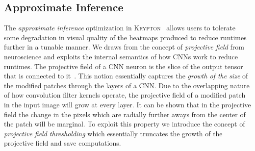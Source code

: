 \documentclass{vldb}
\newcommand{\system}{\textsc{Krypton}}
\begin{document}
\subsection{Approximate Inference}
The \textit{approximate inference} optimization in \system~ allows users to tolerate some degradation in visual quality of the heatmaps produced to reduce runtimes further in a tunable manner.
We draws from the concept of \textit{projective field} from neuroscience and exploits the internal semantics of how CNNs work to reduce runtimes.
The projective field of a CNN neuron is the slice of the output tensor that is connected to it~\cite{basiccnnoperations}.
This notion essentially captures the \textit{growth of the size} of the modified patches through the layers of a CNN.
Due to the overlapping nature of how convolution filter kernels operate, the projective field of a modified patch in the input image will grow at every layer.
It can be shown that in the projective field the change in the pixels which are radially further aways from the center of the patch will be marginal.
To exploit this property we introduce the concept of \textit{projective field thresholding} which essentially truncates the growth of the projective field and save computations.


\end{document}

